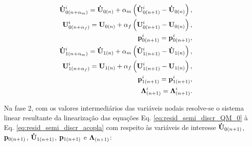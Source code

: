 \documentclass[tese_patricia]{subfiles}
\begin{document}
\begin{align}
	\mathbf{\dot{U}}_{0({n+\alpha_m})}^{i} = \mathbf{\dot{U}}_{0(n)} + \alpha_m \left( \mathbf{\dot{U}}_{0(n+1)}^{i} - \mathbf{\dot{U}}_{0(n)} \right), \label{eq:inter_acel_0}\\
	\mathbf{U}_{0(n+\alpha_f)}^{i} = \mathbf{U}_{0(n)} + \alpha_f \left( \mathbf{U}_{0(n+1)}^{i} - \mathbf{U}_{0(n)} \right), \label{eq:inter_vel_0}\\
	\mathbf{p}_{0(n+1)}^{i} = \mathbf{p}_{0(n+1)}^{i}, \label{eq:inter_press_0} \\
	\mathbf{\dot{U}}_{1(n+\alpha_m)}^{i} = \mathbf{\dot{U}}_{1(n)} + \alpha_m \left( \mathbf{\dot{U}}_{1(n+1)}^{i} - \mathbf{\dot{U}}_{1(n)} \right), \label{eq:inter_acel_1}\\
	\mathbf{U}_{1(n+\alpha_f)}^{i} = \mathbf{U}_{1(n)} + \alpha_f \left( \mathbf{U}_{1(n+1)}^{i} - \mathbf{U}_{1(n)} \right), \label{eq:inter_vel_1}\\
	\mathbf{p}_{1(n+1)}^{i} = \mathbf{p}_{1(n+1)}^{i},\label{eq:inter_press_1} \\
	\boldsymbol{\Lambda}_{(n+1)}^{i} = \boldsymbol{\Lambda}_{(n+1)}^{i}. \label{eq:inter_lag_mult}
\end{align}

Na fase 2, com os valores intermediários das variáveis nodais resolve-se o sistema linear resultante da linearização das equações Eq. \eqref{eq:resid_semi_discr_QM_0} à Eq. \eqref{eq:resid_semi_discr_acopla} com respeito às variáveis de interesse $\mathbf{\dot{U}}_{0(n+1)}$, $\mathbf{p}_{0(n+1)}$,  $\mathbf{\dot{U}}_{1(n+1)}$, $\mathbf{p}_{1(n+1)}$ e $\boldsymbol{\Lambda}_{(n+1)}$:
\end{document}

